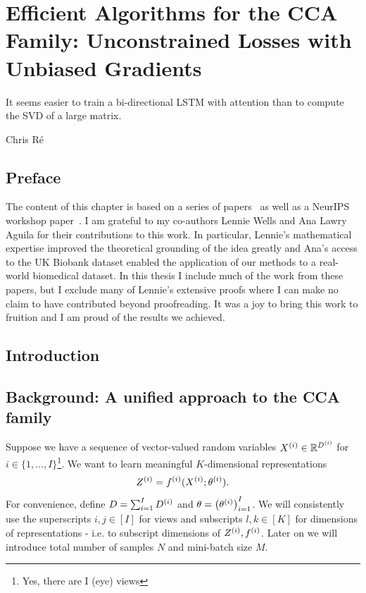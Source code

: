 \graphicspath{{chapters/gradient_descent/}}
\chapter{Efficient Algorithms for the CCA Family: Unconstrained Losses with Unbiased Gradients}\label{chap:gradient_descent}
\epigraph{It seems easier to train a bi-directional LSTM with attention than to compute the SVD of a large matrix.\cite{gemp}}{Chris Ré}
\minitoc
\section*{Preface}
The content of this chapter is based on a series of papers~\citep{chapman2022generalized, chapman2023efficient} as well as a NeurIPS workshop paper~\citep{chapman2023neurips}.
I am grateful to my co-authors Lennie Wells and Ana Lawry Aguila for their contributions to this work.
In particular, Lennie's mathematical expertise improved the theoretical grounding of the idea greatly and Ana's access to the UK Biobank dataset enabled the application of our methods to a real-world biomedical dataset.
In this thesis I include much of the work from these papers, but I exclude many of Lennie's extensive proofs where I can make no claim to have contributed beyond proofreading.
It was a joy to bring this work to fruition and I am proud of the results we achieved.

\section{Introduction}

\section{Background: A unified approach to the CCA family}\label{sec:background-unified}

Suppose we have a sequence of vector-valued random variables $X^{(i)} \in \mathbb{R}^{D^{(i)}}$ for $i \in \{1, \dots, I \}$\footnote{Yes, there are I (eye) views}.
We want to learn meaningful $K$-dimensional representations
\begin{equation}\label{eq:general-form-of-representations}
    Z^{(i)} = f^{(i)}( X^{(i)}; \theta^{(i)}).
\end{equation}
For convenience, define $D = \sum_{i=1}^I D^{(i)}$ and $\theta = \left(\theta^{(i)}\right)_{i=1}^I$.
We will consistently use the superscripts $i,j \in [I]$ for views
and subscripts $l,k \in [K]$ for dimensions of representations - i.e. to subscript dimensions of $Z^{(i)}, f^{(i)}$.
Later on we will introduce total number of samples $N$ and mini-batch size $M$.

